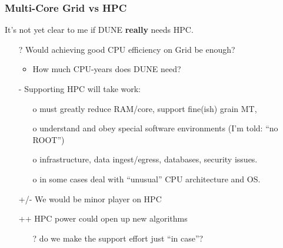 \documentclass[xcolor=dvipsnames]{beamer}
\begin{document}
\begin{frame}
  \frametitle{Multi-Core Grid vs HPC}
  It's not yet clear to me if DUNE \textbf{really} needs HPC. 
  \begin{itemize}
  \item[?] Would achieving good CPU efficiency on Grid be enough?
    \begin{itemize}\scriptsize
    \item How much CPU-years does DUNE need?
    \end{itemize}
  \item[-] Supporting HPC will take work:
    \begin{itemize}\scriptsize
    \item[o] must greatly reduce RAM/core, support fine(ish) grain MT, 
    \item[o] understand and obey special software environments (I'm told: ``no ROOT'') 
    \item[o] infrastructure, data ingest/egress, databases, security issues.
    \item[o] in some cases deal with ``unusual'' CPU architecture and OS.
    \end{itemize}
  \item[+/-] We would be minor player on HPC
  \item[++] HPC power could open up new algorithms
    \begin{itemize}\scriptsize
    \item[?] do we make the support effort just ``in case''?
    \end{itemize}
  \end{itemize}

\end{frame}
\end{document}
